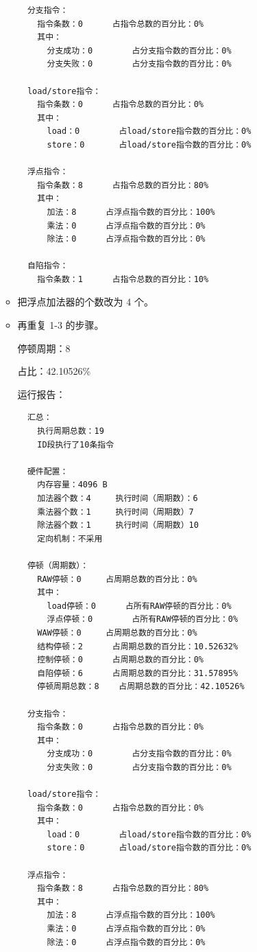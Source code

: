 \documentclass[blue,normal,cn]{elegantnote}
\begin{document}
\begin{enumerate}[wide=0pt, listparindent=2em, parsep=0pt]
\begin{itemize}[leftmargin=3em, listparindent=2em, parsep=0pt]
\begin{lstlisting}
  分支指令：
    指令条数：0		占指令总数的百分比：0%
    其中：
      分支成功：0		占分支指令数的百分比：0%
      分支失败：0		占分支指令数的百分比：0%

  load/store指令：
    指令条数：0		占指令总数的百分比：0%
    其中：
      load：0		占load/store指令数的百分比：0%
      store：0		占load/store指令数的百分比：0%

  浮点指令：
    指令条数：8		占指令总数的百分比：80%
    其中：
      加法：8		占浮点指令数的百分比：100%
      乘法：0		占浮点指令数的百分比：0%
      除法：0		占浮点指令数的百分比：0%

  自陷指令：
    指令条数：1		占指令总数的百分比：10%
\end{lstlisting}

              \item 把浮点加法器的个数改为 4 个。
              \item 再重复 1-3 的步骤。

                    \textcolor{ans} {停顿周期：8}

                    \textcolor{ans} {占比：42.10526\%}

                    \textcolor{ans}{运行报告：}
                    \begin{lstlisting}
  汇总：
    执行周期总数：19
    ID段执行了10条指令

  硬件配置：
    内存容量：4096 B
    加法器个数：4		执行时间（周期数）：6
    乘法器个数：1		执行时间（周期数）7		
    除法器个数：1		执行时间（周期数）10		
    定向机制：不采用

  停顿（周期数）：
    RAW停顿：0		占周期总数的百分比：0%
    其中：
      load停顿：0		占所有RAW停顿的百分比：0%
      浮点停顿：0		占所有RAW停顿的百分比：0%
    WAW停顿：0		占周期总数的百分比：0%
    结构停顿：2		占周期总数的百分比：10.52632%
    控制停顿：0		占周期总数的百分比：0%
    自陷停顿：6		占周期总数的百分比：31.57895%
    停顿周期总数：8	占周期总数的百分比：42.10526%

  分支指令：
    指令条数：0		占指令总数的百分比：0%
    其中：
      分支成功：0		占分支指令数的百分比：0%
      分支失败：0		占分支指令数的百分比：0%

  load/store指令：
    指令条数：0		占指令总数的百分比：0%
    其中：
      load：0		占load/store指令数的百分比：0%
      store：0		占load/store指令数的百分比：0%

  浮点指令：
    指令条数：8		占指令总数的百分比：80%
    其中：
      加法：8		占浮点指令数的百分比：100%
      乘法：0		占浮点指令数的百分比：0%
      除法：0		占浮点指令数的百分比：0%


\end{lstlisting}
\end{itemize}
\end{enumerate}
\end{document}
